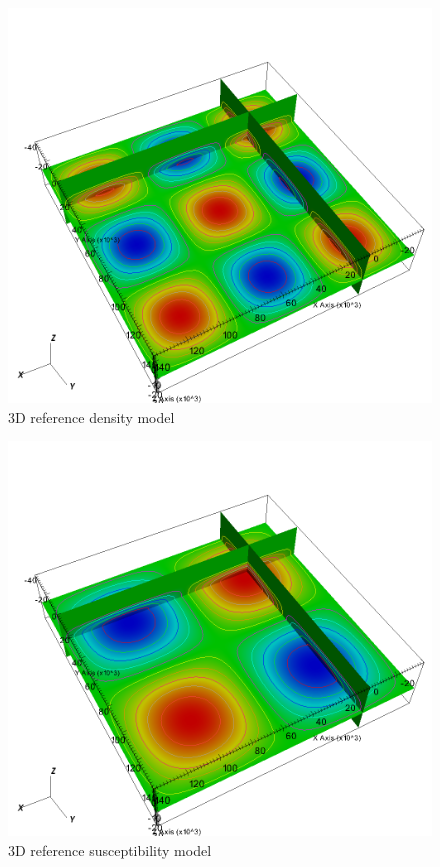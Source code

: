 \begin{figure}
\centering
\includegraphics[width=\textwidth]{joint3D4mag6grav-gref.png}
\caption{3D reference density model}
\label{fig:joint3D4mag6grav-gref}
\end{figure}


\begin{figure}
\centering
\includegraphics[width=\textwidth]{joint3D4mag6grav-mref.png}
\caption{3D reference susceptibility model}
\label{fig:joint3D4mag6grav-mref}
\end{figure}



